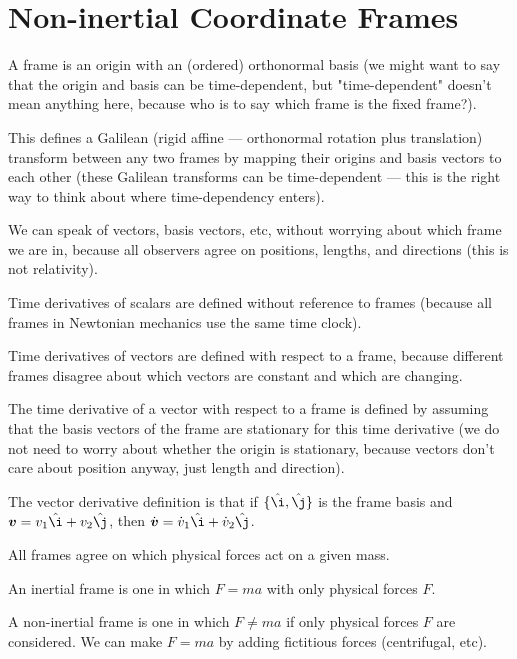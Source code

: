 \documentclass{article}
\renewcommand{\vec}[1]{\boldsymbol{#1}}
\begin{document}

\section{Non-inertial Coordinate Frames}

A frame is an origin with an (ordered) orthonormal basis (we might
want to say that the origin and basis can be time-dependent, but
"time-dependent" doesn't mean anything here, because who is to say
which frame is the fixed frame?).

This defines a Galilean (rigid affine --- orthonormal rotation plus
translation) transform between any two frames by mapping their origins
and basis vectors to each other (these Galilean transforms can be
time-dependent --- this is the right way to think about where
time-dependency enters).

We can speak of vectors, basis vectors, etc, without worrying about
which frame we are in, because all observers agree on positions,
lengths, and directions (this is not relativity).

Time derivatives of scalars are defined without reference to frames
(because all frames in Newtonian mechanics use the same time clock).

Time derivatives of vectors are defined with respect to a frame,
because different frames disagree about which vectors are constant and
which are changing.

The time derivative of a vector with respect to a frame is defined by
assuming that the basis vectors of the frame are stationary for this
time derivative (we do not need to worry about whether the origin is
stationary, because vectors don't care about position anyway, just
length and direction).

The vector derivative definition is that if $\{\hat\i, \hat\j\}$ is
the frame basis and $\vec{v} = v_1 \hat\i + v_2 \hat\j$, then
$\dot{\vec{v}} = \dot{v}_1 \hat\i + \dot{v}_2 \hat\j$.

All frames agree on which physical forces act on a given mass.

An inertial frame is one in which $F = ma$ with only physical forces
$F$.

A non-inertial frame is one in which $F \neq ma$ if only physical
forces $F$ are considered. We can make $F = ma$ by adding fictitious
forces (centrifugal, etc).
\end{document}
